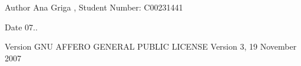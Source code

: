 \begin{DoxyAuthor}{Author}
Ana Griga , Student Number\+: C00231441 
\end{DoxyAuthor}
\begin{DoxyDate}{Date}
07.. 
\end{DoxyDate}
\begin{DoxyVersion}{Version}
G\+NU A\+F\+F\+E\+RO G\+E\+N\+E\+R\+AL P\+U\+B\+L\+IC L\+I\+C\+E\+N\+SE Version 3, 19 November 2007 
\end{DoxyVersion}

